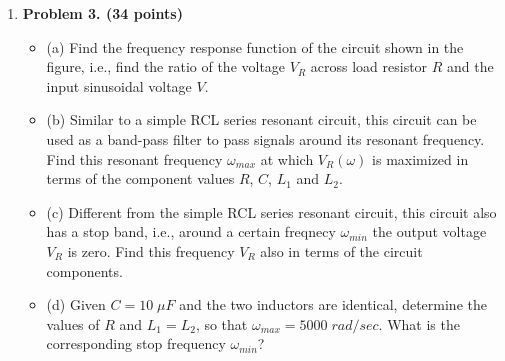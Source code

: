 \begin{enumerate}


\item {\bf Problem 3. (34 points)} 

\begin{itemize}
\item (a) Find the frequency response function of the circuit shown in 
the figure, i.e., find the ratio of the voltage $V_R$ across load resistor
$R$ and the input sinusoidal voltage $V$. 

\item (b) Similar to a simple RCL series resonant circuit, this circuit
can be used as a band-pass filter to pass signals around its resonant 
frequency. Find this resonant frequency $\omega_{max}$ at which 
$V_R(\omega)$ is maximized in terms of the component values $R$, $C$, 
$L_1$ and $L_2$. 

\item (c) Different from the simple RCL series resonant circuit, this 
circuit also has a stop band, i.e., around a certain freqnecy 
$\omega_{min}$ the output voltage $V_R$ is zero. Find this frequency 
$V_R$ also in terms of the circuit components. 

\item (d) Given $C=10\;\mu F$ and the two inductors are identical, 
determine the values of $R$ and $L_1=L_2$, so that $\omega_{max}=5000
\;rad/sec$. What is the corresponding stop frequency $\omega_{min}$?

\end{itemize}



\end{enumerate}
